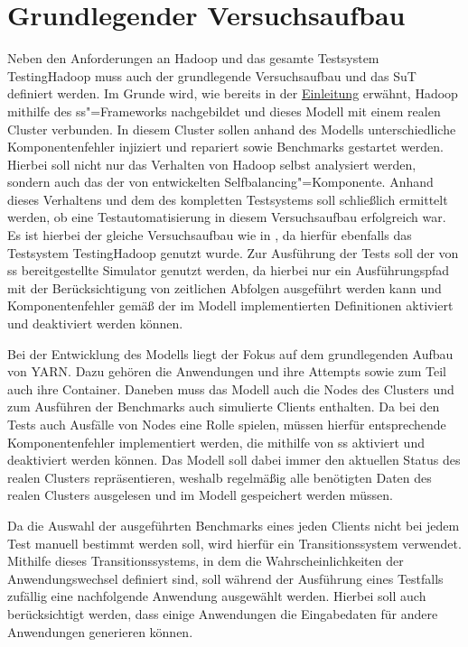 \section{Grundlegender Versuchsaufbau}
\label{sec:clusterSetup}

Neben den Anforderungen an Hadoop und das gesamte Testsystem TestingHadoop muss auch der grundlegende Versuchsaufbau und das \gls{SuT} definiert werden.
Im Grunde wird, wie bereits in der \hyperref[ch:intro]{Einleitung} erwähnt, Hadoop mithilfe des \gls{ss}"=Frameworks nachgebildet und dieses Modell mit einem realen Cluster verbunden.
In diesem Cluster sollen anhand des Modells unterschiedliche Komponentenfehler injiziert und repariert sowie Benchmarks gestartet werden.
Hierbei soll nicht nur das Verhalten von Hadoop selbst analysiert werden, sondern auch das der von \citeauthor{Zhang2016} entwickelten Selfbalancing"=Komponente.
Anhand dieses Verhaltens und dem des kompletten Testsystems soll schließlich ermittelt werden, ob eine Testautomatisierung in diesem Versuchsaufbau erfolgreich war.
Es ist hierbei der gleiche Versuchsaufbau wie in \cite{Eberhardinger2018}, da hierfür ebenfalls das Testsystem TestingHadoop genutzt wurde.
Zur Ausführung der Tests soll der von \gls{ss} bereitgestellte Simulator genutzt werden, da hierbei nur ein Ausführungspfad mit der Berücksichtigung von zeitlichen Abfolgen ausgeführt werden kann und Komponentenfehler gemäß der im Modell implementierten Definitionen aktiviert und deaktiviert werden können.

Bei der Entwicklung des Modells liegt der Fokus auf dem grundlegenden Aufbau von YARN.
Dazu gehören die Anwendungen und ihre Attempts sowie zum Teil auch ihre Container.
Daneben muss das Modell auch die Nodes des Clusters und zum Ausführen der Benchmarks auch simulierte Clients enthalten.
Da bei den Tests auch Ausfälle von Nodes eine Rolle spielen, müssen hierfür entsprechende Komponentenfehler implementiert werden, die mithilfe von \gls{ss} aktiviert und deaktiviert werden können.
Das Modell soll dabei immer den aktuellen Status des realen Clusters repräsentieren, weshalb regelmäßig alle benötigten Daten des realen Clusters ausgelesen und im Modell gespeichert werden müssen.

Da die Auswahl der ausgeführten Benchmarks eines jeden Clients nicht bei jedem Test manuell bestimmt werden soll, wird hierfür ein Transitionssystem verwendet.
Mithilfe dieses Transitionssystems, in dem die Wahrscheinlichkeiten der Anwendungswechsel definiert sind, soll während der Ausführung eines Testfalls zufällig eine nachfolgende Anwendung ausgewählt werden.
Hierbei soll auch berücksichtigt werden, dass einige Anwendungen die Eingabedaten für andere Anwendungen generieren können.

